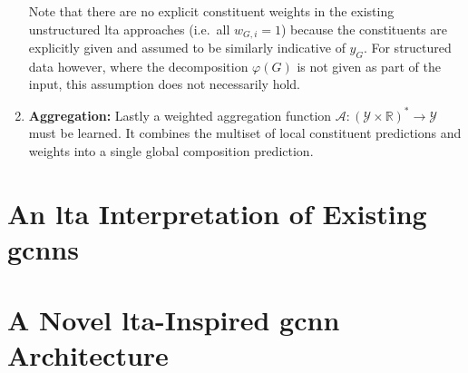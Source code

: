 \begin{enumerate}[label=\textbf{\arabic*.}]
		Note that there are no explicit constituent weights in the existing unstructured \ac{lta} approaches (i.e.\ all $w_{G, i} = 1$) because the constituents are explicitly given and assumed to be similarly indicative of $y_G$.
		For structured data however, where the decomposition $\varphi(G)$ is not given as part of the input, this assumption does not necessarily hold.
	\item \textbf{Aggregation:}
		Lastly a weighted aggregation function $\mathcal{A}: {(\mathcal{Y} \times \mathbb{R})}^{*} \to \mathcal{Y}$ must be learned.
		It combines the multiset of local constituent predictions and weights into a single global composition prediction.
\end{enumerate}

\section{An \acs*{lta} Interpretation of Existing \acsp*{gcnn}}%
\label{sec:ltag:interpretation}

\section{A Novel \acs*{lta}-Inspired \acs*{gcnn} Architecture}%
\label{sec:ltag:wl2gnn}
